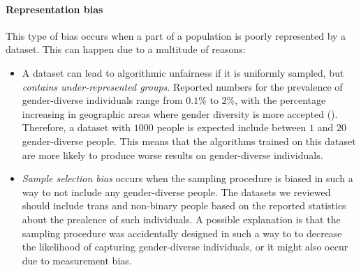 \documentclass[nonacm,sigconf,review,balance=false]{acmart}
\begin{document}
\paragraph*{Representation bias} This type of bias occurs when a part of a population is poorly represented by a dataset. This can happen due to a multitude of reasons:
\begin{itemize}
    \item A dataset can lead to algorithmic unfairness if it is uniformly sampled, but \emph{contains under-represented groups}. Reported numbers for the prevalence of gender-diverse individuals range from $0.1\%$ to $2\%$, with the percentage increasing in geographic areas where gender diversity is more accepted (). Therefore, a dataset with $1000$ people is expected include between $1$ and $20$ gender-diverse people. This means that the algorithms trained on this dataset are more likely to produce worse results on gender-diverse individuals.
    \item \emph{Sample selection bias} occurs when the sampling procedure is biased in such a way to not include any gender-diverse people. The datasets we reviewed should include trans and non-binary people based on the reported statistics about the prealence of such individuals. A possible explanation is that the sampling procedure was accidentally designed in such a way to to decrease the likelihood of capturing gender-diverse individuals, or it might also occur due to measurement bias.
\end{itemize}

\end{document}
